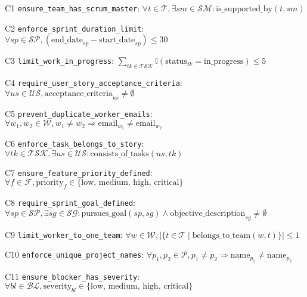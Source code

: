 \documentclass[12pt]{article}
\begin{document}
    \item[C1] \texttt{ensure\_team\_has\_scrum\_master}: 
    $\forall t \in \mathcal{T}, \exists sm \in \mathcal{SM}: \text{is\_supported\_by}(t, sm)$
    
    \item[C2] \texttt{enforce\_sprint\_duration\_limit}: 
    $\forall sp \in \mathcal{SP}, (\text{end\_date}_{sp} - \text{start\_date}_{sp}) \leq 30$
    
    \item[C3] \texttt{limit\_work\_in\_progress}: 
    $\sum_{tk \in \mathcal{TSK}} \mathbb{I}(\text{status}_{tk} = \text{in\_progress}) \leq 5$
    
    \item[C4] \texttt{require\_user\_story\_acceptance\_criteria}: 
    $\forall us \in \mathcal{US}, \text{acceptance\_criteria}_{us} \neq \emptyset$
    
    \item[C5] \texttt{prevent\_duplicate\_worker\_emails}: 
    $\forall w_1, w_2 \in \mathcal{W}, w_1 \neq w_2 \Rightarrow \text{email}_{w_1} \neq \text{email}_{w_2}$
    
    \item[C6] \texttt{enforce\_task\_belongs\_to\_story}: 
    $\forall tk \in \mathcal{TSK}, \exists us \in \mathcal{US}: \text{consists\_of\_tasks}(us, tk)$
    
    \item[C7] \texttt{ensure\_feature\_priority\_defined}: 
    $\forall f \in \mathcal{F}, \text{priority}_f \in \{\text{low, medium, high, critical}\}$
    
    \item[C8] \texttt{require\_sprint\_goal\_defined}: 
    $\forall sp \in \mathcal{SP}, \exists sg \in \mathcal{SG}: \text{pursues\_goal}(sp, sg) \land \text{objective\_description}_{sg} \neq \emptyset$
    
    \item[C9] \texttt{limit\_worker\_to\_one\_team}: 
    $\forall w \in \mathcal{W}, |\{t \in \mathcal{T} \mid \text{belongs\_to\_team}(w, t)\}| \leq 1$
    
    \item[C10] \texttt{enforce\_unique\_project\_names}: 
    $\forall p_1, p_2 \in \mathcal{P}, p_1 \neq p_2 \Rightarrow \text{name}_{p_1} \neq \text{name}_{p_2}$
    
    \item[C11] \texttt{ensure\_blocker\_has\_severity}: 
    $\forall bl \in \mathcal{BL}, \text{severity}_{bl} \in \{\text{low, medium, high, critical}\}$
    
\end{document}
